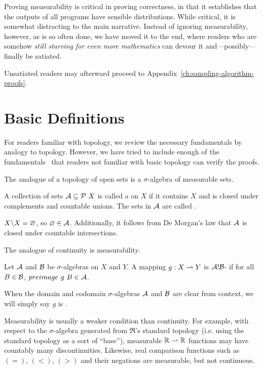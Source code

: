 
Proving measurability is critical in proving correctness, in that it establishes that the outputs of all programs have sensible distributions.
While critical, it is somewhat distracting to the main narrative.
Instead of ignoring measurability, however, as is so often done, we have moved it to the end, where readers who are somehow \emph{still starving for even more mathematics} can devour it and---possibly---finally be satiated.

Unsatiated readers may afterward proceed to Appendix~\ref{ch:sampling-algorithm-proofs}.

\section{Basic Definitions}

For readers familiar with topology, we review the necessary fundamentals by analogy to topology.
However, we have tried to include enough of the fundamentals~\cite{cit:klenke-2006-probability} that readers not familiar with basic topology can verify the proofs.

The analogue of a topology of open sets is a $\sigma$-algebra of measurable sets.

\begin{definition}
A collection of sets $\mathcal{A} \subseteq \mathcal{P}~X$ is called a  on $X$ if it contains $X$ and is closed under complements and countable unions.
The sets in $\mathcal{A}$ are called .
\end{definition}

$X \backslash X = \varnothing$, so $\varnothing \in \mathcal{A}$.
Additionally, it follows from De Morgan's law that $\mathcal{A}$ is closed under countable intersections.

The analogue of continuity is measurability.

\begin{definition}
Let $\mathcal{A}$ and $\mathcal{B}$ be $\sigma$-algebras on $X$ and $Y$.
A mapping $g : X \rightharpoonup Y$ is $\mathcal{A}!\mathcal{B}$- if for all $B \in \mathcal{B}$, $preimage~g~B \in \mathcal{A}$.
\end{definition}

When the domain and codomain $\sigma$-algebras $\mathcal{A}$ and $\mathcal{B}$ are clear from context, we will simply say $g$ is .

Measurability is usually a weaker condition than continuity.
For example, with respect to the $\sigma$-algebra generated from $\Re$'s standard topology (i.e. using the standard topology as a sort of ``base''), measurable $\mathbb{R} \rightharpoonup \mathbb{R}$ functions may have countably many discontinuities.
Likewise, real comparison functions such as $(=)$, $(<)$, $(>)$ and their negations are measurable, but not continuous.

